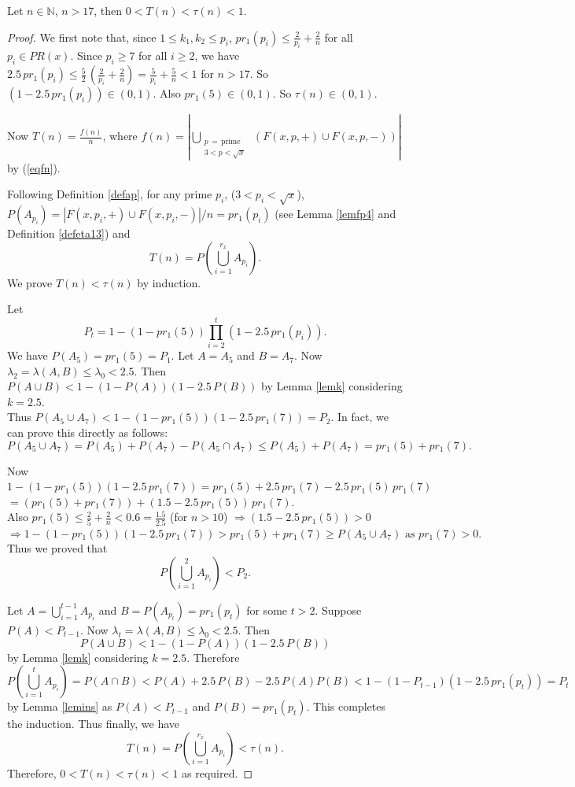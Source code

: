 \documentclass[10pt,a4paper]{amsart}
\newcommand{\Nat}{\mathbb{N}}
\begin{document}
\begin{lemma}\label{lem1good}
Let $n\in\Nat$, $n>17$, then $0<T(n)<\tau(n)<1$.
\end{lemma}

\begin{proof}
We first note that, since $1\leq k_1,k_2\leq p_i$, $pr_1(p_i)\leq \frac{2}{p_i}+\frac{2}{n}$ for all $p_i\in PR(x)$. Since $p_i\geq 7$ for all $i\geq 2$, we have $2.5\, pr_1(p_i)\leq \frac{5}{2}\, (\frac{2}{p_i}+\frac{2}{n})=\frac{5}{p_i}+\frac{5}{n}<1$ for $n>17$. So $(1-2.5\, pr_1(p_i))\in (0,1)$. Also $pr_1(5)\in (0,1)$. So $\tau(n)\in (0,1)$. 

\vspace{1em}
\noindent
Now $T(n)=\frac{f(n)}{n}$, where $f(n)=|\bigcup\limits_{\substack{p\, =\, \text{prime}\\ 3<p<\sqrt{x}}} \ \left(F(x,p,+)\cup F(x,p,-)\right)|$ by (\ref{eqfn}).

\vspace{1em}
\noindent
 Following Definition \ref{defap}, for any prime $p_i$, ($3<p_i<\sqrt{x}$),\\
 $P(A_{p_i})=|F(x,p_i,+)\cup F(x,p_i,-)|/n=pr_1(p_i)$ (see Lemma \ref{lemfp4} and Definition \ref{defeta13}) and 
$$T(n)=P(\bigcup\limits_{i=1}^{r_x} A_{p_i}).$$
We prove $T(n)<\tau(n)$ by induction. 

\vspace{1em}
\noindent
Let
$$P_{t}=1-(1-pr_1(5))\prod\limits_{i=2}^{t} (1-2.5\, pr_1(p_i)).$$
We have $P(A_5)=pr_1(5)=P_1$. Let $A=A_5$ and $B=A_7$. Now $\lambda_2=\lambda(A,B)\leq \lambda_0<2.5$. Then $P(A\cup B)<1-(1-P(A))(1-2.5\, P(B))$ by Lemma \ref{lemk} considering $k=2.5$.\\
 Thus $P(A_5\cup A_7)<1-(1-pr_1(5))(1-2.5\, pr_1(7))=P_2$. In fact, we can prove this directly as follows:
$$P(A_5\cup A_7)=P(A_5)+P(A_7)-P(A_5\cap A_7)\leq P(A_5)+P(A_7)=pr_1(5)+pr_1(7).$$

\noindent
Now $1-(1-pr_1(5))(1-2.5\, pr_1(7))=pr_1(5)+2.5\, pr_1(7)-2.5\, pr_1(5)\, pr_1(7)$\\[0.5em]
\null\hspace{2.3in} $= \left(pr_1(5)+pr_1(7)\right)+\left(1.5-2.5\, pr_1(5)\right)\, pr_1(7)$.\\[0.5em]
Also $pr_1(5)\leq \frac{2}{5}+\frac{2}{n}<0.6=\frac{1.5}{2.5}$ (for $n> 10$) $\Longrightarrow \left(1.5-2.5\, pr_1(5)\right)>0$\\[0.5em]
$\Longrightarrow 1-(1-pr_1(5))(1-2.5\, pr_1(7))>pr_1(5)+pr_1(7)\geq P(A_5\cup A_7) \text{ as }pr_1(7)>0.$
Thus we proved that 
$$P(\bigcup\limits_{i=1}^{2} A_{p_i}) <P_2.$$

\vspace{1em}
\noindent
Let $A=\bigcup\limits_{i=1}^{t-1} A_{p_i}$ and $B=P(A_{p_t})=pr_1(p_t)$ for some $t>2$. Suppose $P(A)<P_{t-1}$. Now $\lambda_t=\lambda(A,B)\leq \lambda_0<2.5$. Then 
$$P(A\cup B)<1-(1-P(A))(1-2.5\, P(B))$$
by Lemma \ref{lemk} considering $k=2.5$. Therefore 
$$P(\bigcup\limits_{i=1}^{t} A_{p_i})=P(A\cap B)<P(A)+2.5\, P(B)-2.5\, P(A)P(B)<1-(1-P_{t-1})(1-2.5\, pr_1(p_t))=P_t$$
by Lemma \ref{lemins} as $P(A)<P_{t-1}$ and $P(B)=pr_1(p_t)$. This completes the induction. Thus finally, we have 
$$T(n)=P(\bigcup\limits_{i=1}^{r_x} A_{p_i})<\tau(n).$$
Therefore, $0<T(n)<\tau(n)<1$ as required.
\end{proof}
\end{document}
